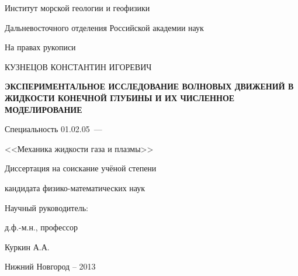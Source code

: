 \thispagestyle{empty}

\begin{center}
Институт морской геологии и геофизики\par
Дальневосточного отделения Российской академии наук\par
\par
\end{center}

\vspace{15mm}
\begin{flushright}
На правах рукописи

\end{flushright}

\vspace{25mm}
\begin{center}
{\large КУЗНЕЦОВ КОНСТАНТИН ИГОРЕВИЧ}
\end{center}

\vspace{5mm}
\begin{center}
{\bf \large ЭКСПЕРИМЕНТАЛЬНОЕ ИССЛЕДОВАНИЕ ВОЛНОВЫХ ДВИЖЕНИЙ В ЖИДКОСТИ КОНЕЧНОЙ ГЛУБИНЫ И ИХ ЧИСЛЕННОЕ МОДЕЛИРОВАНИЕ
\par}

\vspace{10mm}
{%
Специальность 01.02.05~---

<<Механика жидкости газа и плазмы>>
}

Диссертация на соискание учёной степени

кандидата физико-математических наук
\end{center}

\vspace{20mm}
\begin{flushright}
Научный руководитель:

д.ф.-м.н., профессор

Куркин А.А.

\end{flushright}

\vspace{15mm}
\begin{center}
{Нижний Новгород -- 2013}
\end{center}

\newpage
